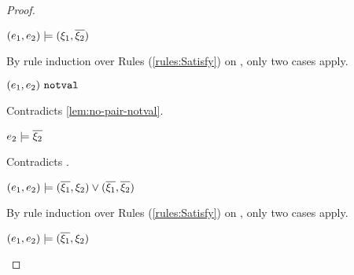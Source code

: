 \begin{proof}
\begin{byCases}
\begin{byCases}
\begin{byCases}
            \begin{byCases}
            \item[\text{(\ref{rule:CSOr1})}]
                \begin{pfsteps*}
                \item $(e_1 , e_2) \models (\xi_1 , \overline{\xi_2})$  
                \end{pfsteps*}
                By rule induction over Rules (\ref{rules:Satisfy}) on , only two cases apply.
                \begin{byCases}
                \item[\text{(\ref{rule:CSNotValPair})}]
                    \begin{pfsteps*}
                    \item $(e_1 , e_2) ~\mathtt{notval}$ 
                    \end{pfsteps*}
                    Contradicts \autoref{lem:no-pair-notval}.
                \item[\text{(\ref{rule:CSPair})}]
                    \begin{pfsteps*}
                    \item $e_2 \models \overline{\xi_2}$ 
                    \end{pfsteps*}
                    Contradicts .
                \end{byCases}
            \item[\text{(\ref{rule:CSOr2})}]
                \begin{pfsteps*}
                \item $(e_1 , e_2) \models (\overline{\xi_1} , \xi_2) \vee (\overline{\xi_1} , \overline{\xi_2})$  
                \end{pfsteps*}
                By rule induction over Rules (\ref{rules:Satisfy}) on , only two cases apply.
                \begin{byCases}
                \item[\text{(\ref{rule:CSOr1})}]
                    \begin{pfsteps*}
                    \item $(e_1 , e_2) \models (\overline{\xi_1} , \xi_2)$  

\end{pfsteps*}
\end{byCases}
\end{byCases}
\end{byCases}
\end{byCases}
\end{byCases}
\end{proof}
